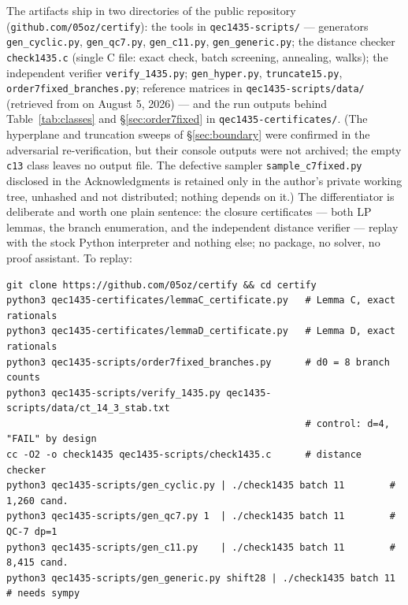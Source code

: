 \documentclass[11pt]{amsart}
\theoremstyle{plain}
\theoremstyle{definition}
\theoremstyle{remark}
\begin{document}
The artifacts ship in two directories of the public repository
(\texttt{github.com/05oz/certify}): the tools in
\texttt{qec1435-scripts/} --- generators \texttt{gen\_cyclic.py},
\texttt{gen\_qc7.py}, \texttt{gen\_c11.py}, \texttt{gen\_generic.py};
the distance checker \texttt{check1435.c} (single C file: exact check,
batch screening, annealing, walks); the independent verifier
\texttt{verify\_1435.py}; \texttt{gen\_hyper.py}, \texttt{truncate15.py},
\texttt{order7fixed\_branches.py}; reference matrices in
\texttt{qec1435-scripts/data/} (retrieved from \cite{Grassl} on August 5,
2026) --- and the run outputs behind Table~\ref{tab:classes} and
\S\ref{sec:order7fixed} in \texttt{qec1435-certificates/}. (The
hyperplane and truncation sweeps of
\S\ref{sec:boundary} were confirmed in the adversarial re-verification,
but their console outputs were not archived; the empty \texttt{c13}
class leaves no output file. The defective sampler
\texttt{sample\_c7fixed.py} disclosed in the Acknowledgments is retained
only in the author's private working tree, unhashed and not distributed;
nothing depends on it.) The differentiator is deliberate and worth one
plain sentence: the closure certificates --- both LP lemmas, the branch
enumeration, and the independent distance verifier --- replay with the
stock Python interpreter and nothing else; no package, no solver, no
proof assistant. To replay:

{\linespread{0.9}\small
\begin{verbatim}
git clone https://github.com/05oz/certify && cd certify
python3 qec1435-certificates/lemmaC_certificate.py   # Lemma C, exact rationals
python3 qec1435-certificates/lemmaD_certificate.py   # Lemma D, exact rationals
python3 qec1435-scripts/order7fixed_branches.py      # d0 = 8 branch counts
python3 qec1435-scripts/verify_1435.py qec1435-scripts/data/ct_14_3_stab.txt
                                                     # control: d=4, "FAIL" by design
cc -O2 -o check1435 qec1435-scripts/check1435.c      # distance checker
python3 qec1435-scripts/gen_cyclic.py | ./check1435 batch 11        # 1,260 cand.
python3 qec1435-scripts/gen_qc7.py 1  | ./check1435 batch 11        # QC-7 dp=1
python3 qec1435-scripts/gen_c11.py    | ./check1435 batch 11        # 8,415 cand.
python3 qec1435-scripts/gen_generic.py shift28 | ./check1435 batch 11  # needs sympy
\end{verbatim}
}
\end{document}
